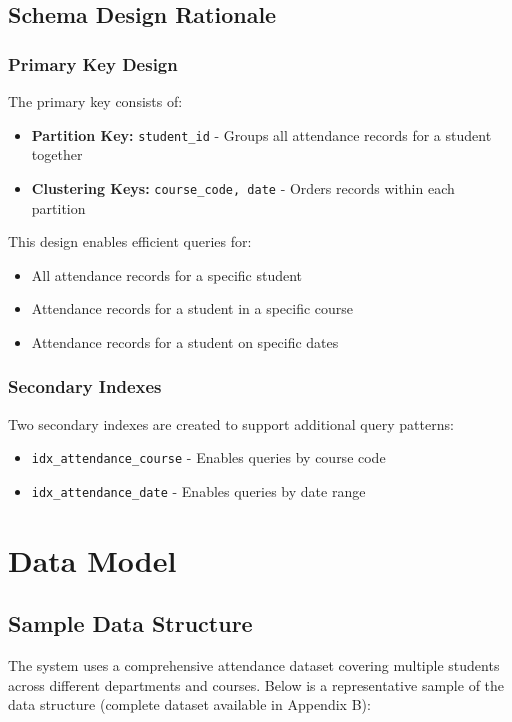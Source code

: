 \subsection{Schema Design Rationale}

\subsubsection{Primary Key Design}
The primary key consists of:
\begin{itemize}
    \item \textbf{Partition Key:} \texttt{student\_id} - Groups all attendance records for a student together
    \item \textbf{Clustering Keys:} \texttt{course\_code, date} - Orders records within each partition
\end{itemize}

This design enables efficient queries for:
\begin{itemize}
    \item All attendance records for a specific student
    \item Attendance records for a student in a specific course
    \item Attendance records for a student on specific dates
\end{itemize}

\subsubsection{Secondary Indexes}
Two secondary indexes are created to support additional query patterns:
\begin{itemize}
    \item \texttt{idx\_attendance\_course} - Enables queries by course code
    \item \texttt{idx\_attendance\_date} - Enables queries by date range
\end{itemize}

\section{Data Model}

\subsection{Sample Data Structure}
The system uses a comprehensive attendance dataset covering multiple students across different departments and courses. Below is a representative sample of the data structure (complete dataset available in Appendix B):

